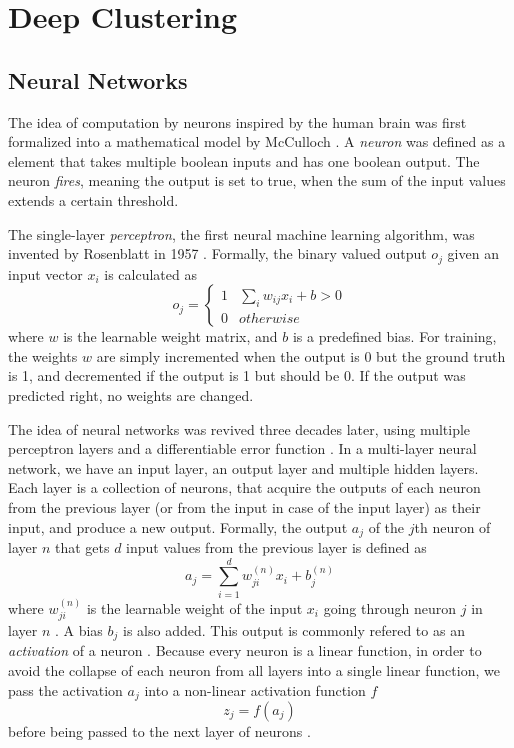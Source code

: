 \section{Deep Clustering}
\subsection{Neural Networks} \label{Neural Networks}

The idea of computation by neurons inspired by the human brain was first formalized into a mathematical model by McCulloch \cite{neural_network_1943}. A \textit{neuron} was defined as a element that takes multiple boolean inputs and has one boolean output. The neuron \textit{fires}, meaning the output is set to true, when the sum of the input values extends a certain threshold.

The single-layer \textit{perceptron}, the first neural machine learning algorithm, was invented by Rosenblatt in 1957 \cite{perceptron}. Formally, the binary valued output $o_j$ given an input vector $x_i$ is calculated as
$$o_j = 
\begin{cases}
    1 & \sum_i w_{ij}x_i + b > 0\\
    0 & otherwise
\end{cases}
$$
where $w$ is the learnable weight matrix, and $b$ is a predefined bias. For training, the weights $w$ are simply incremented when the output is 0 but the ground truth is 1, and decremented if the output is 1 but should be 0. If the output was predicted right, no weights are changed.

The idea of neural networks was revived three decades later, using multiple perceptron layers and a differentiable error function \cite{hidden_layer_backprop}. In a multi-layer neural network, we have an input layer, an output layer and multiple hidden layers. Each layer is a collection of neurons, that acquire the outputs of each neuron from the previous layer (or from the input in case of the input layer) as their input, and produce a new output. Formally, the output $a_j$ of the $j$th neuron of layer $n$ that gets $d$ input values from the previous layer is defined as
$$a_j = \sum^d_{i=1}w_{ji}^{(n)}x_i + b_j^{(n)}$$
where $w_{ji}^{(n)}$ is the learnable weight of the input $x_i$ going through neuron $j$ in layer $n$ \cite{neural_networks_pattern_recognition}. A bias $b_j$ is also added. This output is commonly refered to as an \textit{activation} of a neuron \cite{neural_networks_pattern_recognition}. Because every neuron is a linear function, in order to avoid the collapse of each neuron from all layers into a single linear function, we pass the activation $a_j$ into a non-linear activation function $f$
$$z_j = f(a_j)$$
before being passed to the next layer of neurons \cite{activation_functions}.

